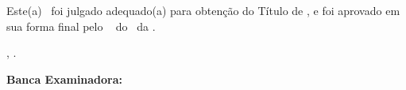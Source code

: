 


\begin{folhadeaprovacao}

    \begin{center}
        {\imprimirautor}

        \begin{center}
            \ABNTEXchapterfont\bfseries\MakeUppercase{\imprimirtitulo}\ifnotempty{\imprimirsubtitulo}{: \imprimirsubtitulo}
        \end{center}

        \begin{minipage}{\textwidth}
            
                Este(a) \imprimirtipotrabalho~foi julgado adequado(a) para obtenção do Título de \imprimirformacao,
                e foi aprovado em sua forma final pelo \imprimirprograma~
                do \imprimircentro~da \imprimirinstituicao.
            
         \end{minipage}%
    \end{center}

    \begin{center}
        \imprimirlocal, \imprimirdata.
    \end{center}


    \begin{flushleft}
        \textbf{Banca Examinadora:}
    \end{flushleft}

    \assinatura{%
        \textbf{\imprimirorientador} \\ \imprimirorientadorRotulo\\
        \imprimirinstituicao~--~\imprimirinstituicaosigla
    }

    \ifnotempty{\imprimircoorientador}{%
        \assinatura{%
            \textbf{\imprimircoorientador} \\ \imprimircoorientadorRotulo \\
            \imprimirinstituicao~--~\imprimirinstituicaosigla
        }
    }





\end{folhadeaprovacao}

